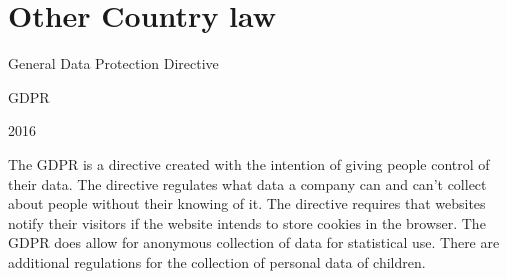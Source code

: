 \documentclass[14pt]{article}
\begin{document}
\section{Other Country law}
    \begin{description}[leftmargin=!, labelwidth=\widthof{\bfseries Year Approved}]
        \item [Name] General Data Protection Directive
        \item [Abbreviation] GDPR
        \item [Year Approved] 2016
        \item [Description] The GDPR is a directive created with the intention of giving people control of their data. The directive regulates what data a company can and can't collect about people without their knowing of it. The directive requires that websites notify their visitors if the website intends to store cookies in the browser. The GDPR does allow for anonymous collection of data for statistical use. There are additional regulations for the collection of personal data of children\cite{GDPR}.
    \end{description}

\newpage


\end{document}
